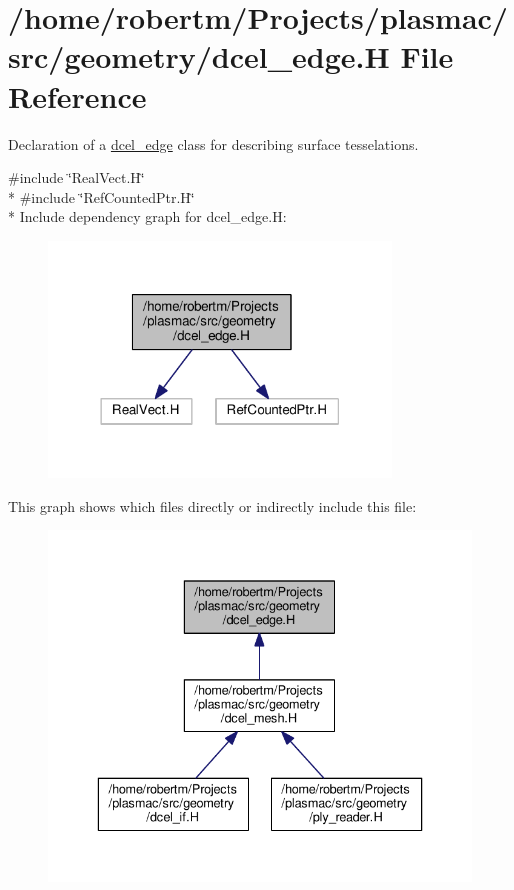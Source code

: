 \hypertarget{dcel__edge_8H}{}\section{/home/robertm/\+Projects/plasmac/src/geometry/dcel\+\_\+edge.H File Reference}
\label{dcel__edge_8H}


Declaration of a \hyperlink{classdcel__edge}{dcel\+\_\+edge} class for describing surface tesselations.  


{\ttfamily \#include \char`\"{}Real\+Vect.\+H\char`\"{}}\\*
{\ttfamily \#include \char`\"{}Ref\+Counted\+Ptr.\+H\char`\"{}}\\*
Include dependency graph for dcel\+\_\+edge.\+H\+:\nopagebreak
\begin{figure}[H]
\begin{center}
\leavevmode
\includegraphics[width=258pt]{dcel__edge_8H__incl}
\end{center}
\end{figure}
This graph shows which files directly or indirectly include this file\+:\nopagebreak
\begin{figure}[H]
\begin{center}
\leavevmode
\includegraphics[width=336pt]{dcel__edge_8H__dep__incl}
\end{center}
\end{figure}
